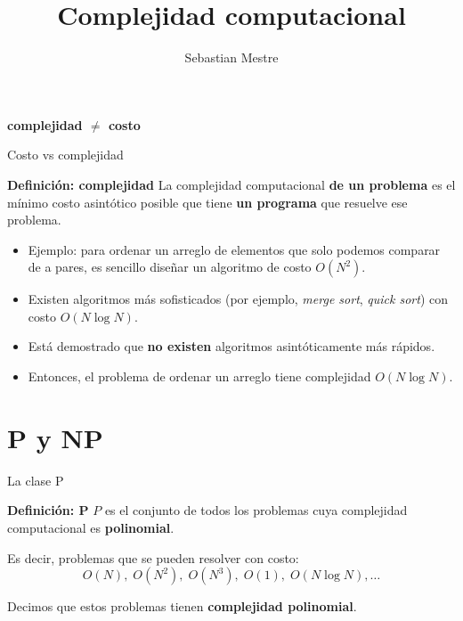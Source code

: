 \documentclass[aspectratio=169]{beamer}
\title{Complejidad computacional}
\author{Sebastian Mestre}
\date{}
\begin{document}
\begin{frame}
  \titlepage
\end{frame}


\begin{frame}
  \centering
  \Huge
  \textbf{complejidad $\neq$ costo}
\end{frame}

\begin{frame}{Costo vs complejidad}
  \begin{block}{\textbf{Definición: complejidad}}
      La complejidad computacional \textbf{de un problema} es el mínimo costo asintótico posible que tiene \textbf{un programa} que resuelve ese problema.

  \end{block}
    
  \begin{itemize}
  
    \item Ejemplo: para ordenar un arreglo de elementos que solo podemos comparar de a pares, es sencillo diseñar un algoritmo de costo $O(N^2)$.
    \item Existen algoritmos más sofisticados (por ejemplo, \emph{merge sort}, \emph{quick sort}) con costo $O(N \log N)$.
    \item Est\'a demostrado que \textbf{no existen} algoritmos asintóticamente más rápidos.
    \item Entonces, el problema de ordenar un arreglo tiene complejidad $O(N \log N)$.
  \end{itemize}
\end{frame}

\section{P y NP}

\begin{frame}{La clase P}
  \begin{block}{\textbf{Definición: P}}
    $P$ es el conjunto de todos los problemas cuya complejidad computacional es \textbf{polinomial}.

    Es decir, problemas que se pueden resolver con costo:
    \[
      O(N),\; O(N^2),\; O(N^3),\; O(1),\; O(N \log N), \dots
    \]
    
    Decimos que estos problemas tienen \textbf{complejidad polinomial}.
  \end{block}
    
\end{frame}
\end{document}
